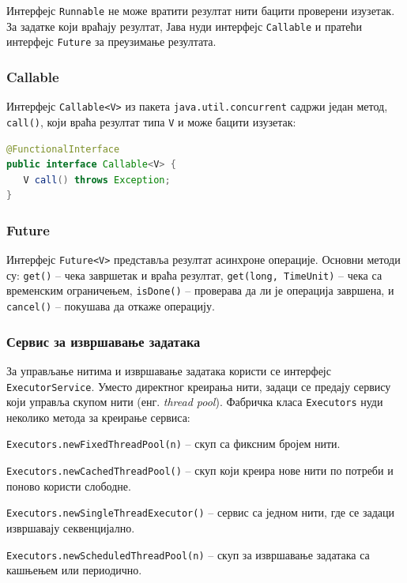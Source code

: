 Интерфејс \texttt{Runnable} не може вратити резултат нити бацити проверени изузетак. За задатке који враћају резултат, Јава нуди интерфејс \texttt{Callable} и пратећи интерфејс \texttt{Future} за преузимање резултата.


\subsubsection{Callable}

Интерфејс \texttt{Callable\textless{}V\textgreater{}} из пакета \texttt{java.util.concurrent} садржи један метод, \texttt{call()}, који враћа резултат типа \texttt{V} и може бацити изузетак:


\begin{lstlisting}[language=Java]
@FunctionalInterface
public interface Callable<V> {
   V call() throws Exception;
}
\end{lstlisting}


\subsubsection{Future}

Интерфејс \texttt{Future\textless{}V\textgreater{}} представља резултат асинхроне операције. Основни методи су: \texttt{get()} – чека завршетак и враћа резултат, \texttt{get(long, TimeUnit)} – чека са временским ограничењем, \texttt{isDone()} – проверава да ли је операција завршена, и \texttt{cancel()} – покушава да откаже операцију.


\subsubsection{Сервис за извршавање задатака}

За управљање нитима и извршавање задатака користи се интерфејс \texttt{ExecutorService}. Уместо директног креирања нити, задаци се предају сервису који управља скупом нити (енг. \textit{thread pool}). Фабричка класа \texttt{Executors} нуди неколико метода за креирање сервиса:

\texttt{Executors.newFixedThreadPool(n)} – скуп са фиксним бројем нити.

\texttt{Executors.newCachedThreadPool()} – скуп који креира нове нити по потреби и поново користи слободне.

\texttt{Executors.newSingleThreadExecutor()} – сервис са једном нити, где се задаци извршавају секвенцијално.

\texttt{Executors.newScheduledThreadPool(n)} – скуп за извршавање задатака са кашњењем или периодично.


